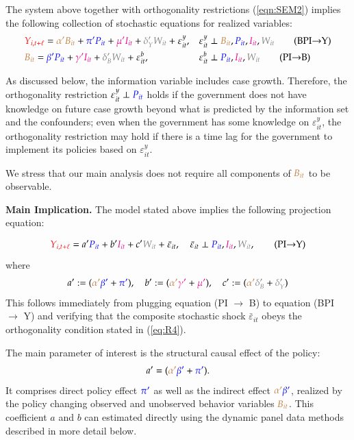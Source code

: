 \documentclass[9pt,twoside,lineno]{pnas-new}
\theoremstyle{definition}
\renewcommand{\to}{{\rightarrow}}
\def\bcolor{\color{brown}}
\def\pcolor{\color{blue}}
\def\icolor{\color{magenta}}
\def\wcolor{\color{gray}}
\def\ycolor{\color{red}}
\begin{document}
The system above together with  orthogonality restrictions (\ref{eqn:SEM2}) implies the following collection of stochastic equations for realized variables:
\begin{align}
   &  {\ycolor  Y_{i,t+\ell}}
    = {\bcolor\alpha ' B_{it}} + {\pcolor\pi 'P_{it}} + {\icolor\mu'I_{it}} + {\wcolor\delta_Y 'W_{it}}  + \varepsilon^y_{it},
    &  & \varepsilon^y_{it} \perp {\bcolor B_{it}}, {\pcolor P_{it}}, {\icolor I_{it}}, {\wcolor W_{it}} \label{eq:R1} \tag{BPI$\to$Y} \\
    &  {\bcolor B_{it}}
     =  {\pcolor \beta' P_{it}} + {\icolor \gamma'I_{it}} +  {\wcolor \delta_B' W_{it}} + \varepsilon^b_{it},
   & & \varepsilon^b_{it} \perp {\pcolor P_{it}}, {\icolor I_{it}}, {\wcolor W_{it}}  \label{eq:R2} \tag{PI$\to$B} 
         \end{align}

As discussed below, the information variable includes case growth. Therefore, the orthogonality restriction  $ \varepsilon^y_{it} \perp   {\pcolor P_{it}}$ holds if  the government does not have knowledge on future case growth beyond what is predicted by the information set and the  confounders; even when the government has some knowledge on $\varepsilon^y_{it}$, the orthogonality restriction may hold if there is a time lag for the government to implement its policies based on $\varepsilon^y_{it}$.

We stress that our  main analysis does not require all components of ${\bcolor B_{it}}$ to be observable. 

\textbf{Main Implication.} The model stated above implies the following projection equation:

\begin{align}
   {\ycolor  Y_{i,t+\ell}}
   =    a'  {\pcolor P_{it}} +b'  {\icolor I_{it} }+ c' {\wcolor W_{it}}  + {\bar \varepsilon}_{it},  \quad   {\bar \varepsilon}_{it} \perp
  {\pcolor P_{it}},  {\icolor I_{it}}, {\wcolor W_{it}},  \label{eq:R4} \tag{PI$\to$Y}
     \end{align}
where 
$$
a' := ( {\bcolor\alpha '}  {\pcolor \beta' }+{\pcolor\pi'} ), \quad b' := ( {\bcolor\alpha '}  {\icolor \gamma'} + {\icolor \mu'}),
\quad c' :=  ( {\bcolor\alpha '}  {\wcolor \delta_B' }+{\wcolor\delta_Y'} )
$$
This follows immediately from plugging equation (PI $\to$ B) to  equation (BPI $\to$ Y) and verifying
that the composite stochastic shock $\bar \varepsilon_{it}$ obeys the orthogonality condition stated 
in  (\ref{eq:R4}).


The main parameter of interest is the structural causal effect of the policy:
$$
a' = ( {\bcolor\alpha '}  {\pcolor \beta' }+{\pcolor\pi'} ).
$$
It comprises direct policy effect ${\pcolor\pi'}$ as well as the indirect effect $ {\bcolor\alpha '}  {\pcolor \beta' }$, realized by 
the policy changing observed and unobserved behavior variables ${\bcolor B_{it}}$.   This coefficient $a$ and $b$ can estimated directly using the dynamic panel data methods described in more detail below.  
\end{document}
